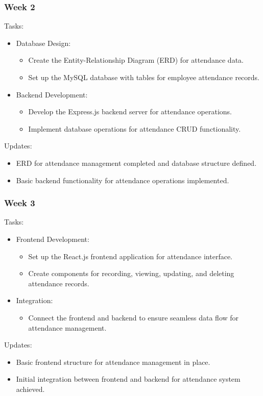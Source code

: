\documentclass[a4paper, 12pt]{article}
\begin{document}
\subsubsection{Week 2}
Tasks:
\begin{itemize}
    \item Database Design:
    \begin{itemize}
        \item Create the Entity-Relationship Diagram (ERD) for attendance data.
        \item Set up the MySQL database with tables for employee attendance records.
    \end{itemize}
    \item Backend Development:
    \begin{itemize}
        \item Develop the Express.js backend server for attendance operations.
        \item Implement database operations for attendance CRUD functionality.
    \end{itemize}
\end{itemize}
Updates:
\begin{itemize}
    \item ERD for attendance management completed and database structure defined.
    \item Basic backend functionality for attendance operations implemented.
\end{itemize}

\subsubsection{Week 3}
Tasks:
\begin{itemize}
    \item Frontend Development:
    \begin{itemize}
        \item Set up the React.js frontend application for attendance interface.
        \item Create components for recording, viewing, updating, and deleting attendance records.
    \end{itemize}
    \item Integration:
    \begin{itemize}
        \item Connect the frontend and backend to ensure seamless data flow for attendance management.
    \end{itemize}
\end{itemize}
Updates:
\begin{itemize}
    \item Basic frontend structure for attendance management in place.
    \item Initial integration between frontend and backend for attendance system achieved.
\end{itemize}
\end{document}
